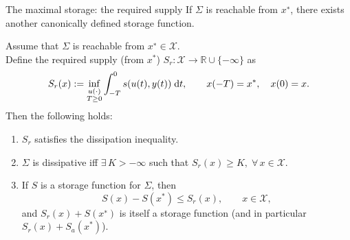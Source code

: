 \documentclass[aspectratio=169]{beamer}
\newcommand{\bbR}{\mathbb{R}}
\begin{document}
\begin{frame}{The maximal storage: the required supply}
	If $\Sigma$ is reachable from $x^∗$, there
	exists another canonically defined storage function. 
\begin{theorem}
	Assume that $\Sigma$ is reachable from $x^∗ \in \mathcal{X}$. \\
	Define the required supply (from $x^*$) $S_r : \mathcal{X} \rightarrow \bbR \cup \{-\infty\}$ as
\begin{equation}\label{eq:Sr}
	S_r(x) := \inf_{\substack{u(\cdot) \\ T \ge 0}} \int_{-T}^0 s(u(t), y(t)) \d t, \qquad x(-T)=x^*, \quad x(0)=x.
\end{equation}
Then the following holds:
\begin{enumerate}
	\item $S_r$ satisfies the dissipation inequality. 
	\item $\Sigma$ is dissipative iff $\exists\, K > −\infty$ such that $S_r (x) \ge K, \; \forall \, x \in \mathcal{X}$.
	\item If $S$ is a 	storage function for $\Sigma$, then
	\begin{equation*}
		S(x) - S(x^*) \le S_r(x), \qquad x \in \mathcal{X},
	\end{equation*}
	and $S_r(x) + S(x^∗)$ is itself a storage function (and in particular $S_r(x) + S_a(x^*)$). 
\end{enumerate}


\end{theorem}
\end{frame}
\end{document}
